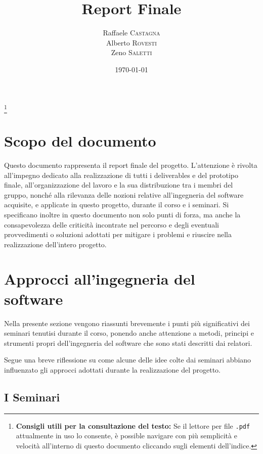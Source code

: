 \documentclass[11pt, a4paper]{article}
\title{Report Finale}
\author{Raffaele \textsc{Castagna}\\
Alberto \textsc{Rovesti}\\
Zeno \textsc{Saletti}}
\date{\today}
\theoremstyle{definition}
\newcommand\blfootnote[1]{%
  \begingroup
  \renewcommand\thefootnote{}\footnote{#1}%
  \addtocounter{footnote}{-1}%
  \endgroup
}
\begin{document}


\tableofcontents\blfootnote{\textbf{Consigli utili per la consultazione del testo:} Se il lettore per file \texttt{.pdf} attualmente in uso lo consente, è possible navigare con più semplicità e velocità all'interno di questo documento cliccando sugli elementi dell'indice.}


\newpage
\section*{Scopo del documento}
Questo documento rappresenta il report finale del progetto. L'attenzione è
rivolta all'impegno dedicato alla realizzazione di tutti i
deliverables e del prototipo finale, all'organizzazione del lavoro e la sua
distribuzione tra i membri del gruppo, nonché
alla rilevanza delle nozioni relative all'ingegneria del software acquisite,
e applicate in questo progetto, durante il corso e i seminari.
Si specificano inoltre in questo documento non solo punti di forza,
ma anche la consapevolezza delle criticità incontrate nel percorso e degli
eventuali provvedimenti o soluzioni adottati per mitigare i problemi e riuscire
nella realizzazione dell'intero progetto.

\newpage
\section{Approcci all'ingegneria del software}
Nella presente sezione vengono riassunti brevemente i punti più significativi
dei seminari tenutisi durante il corso, ponendo anche attenzione a
metodi, principi e strumenti propri dell'ingegneria del software che sono stati
descritti dai relatori.

Segue una breve riflessione su come alcune delle idee colte dai seminari abbiano
influenzato gli approcci adottati durante la realizzazione del progetto.

\subsection{I Seminari}
\end{document}
